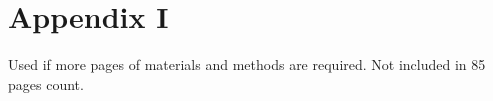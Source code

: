 \graphicspath{{chapters/90_appendix_i/}}
\chapter*{Appendix I}

Used if more pages of materials and methods are required. Not included in 85 pages count.